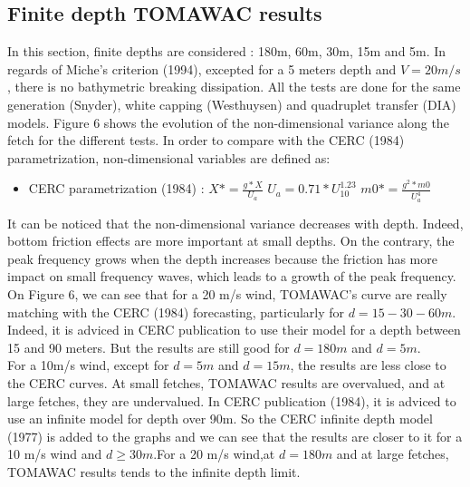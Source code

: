 \documentclass[10pt]{article}
\begin{document}
\subsection{Finite depth TOMAWAC results}
In this section, finite depths are considered : 180m, 60m, 30m, 15m and 5m. In regards of Miche's criterion (1994), excepted for a 5 meters depth and $V = 20m/s$, there is no bathymetric breaking dissipation. All the tests are done for the same generation (Snyder), white capping (Westhuysen) and quadruplet transfer (DIA) models. Figure 6 shows the evolution of the non-dimensional variance along the fetch for the different tests. In order to compare with the CERC (1984) parametrization, non-dimensional variables are defined as:\\
\begin{itemize}
\item CERC parametrization (1984) :
\subitem $X* = \frac{g*X}{U_a}$
\subitem $U_a = 0.71*U_{10}^{1.23}$
\subitem $m0* = \frac{g^2*m0}{U_a^4}$
\end{itemize}
It can be noticed that the non-dimensional variance decreases with depth. Indeed, bottom friction effects are more important at small depths. On the contrary, the peak frequency grows when the depth increases because the friction has more impact on small frequency waves, which leads to a growth of the peak frequency.\\
On Figure 6, we can see that for a 20 m/s wind, TOMAWAC's curve are really matching with the CERC (1984) forecasting, particularly for $d = 15 - 30 - 60 m$. Indeed, it is adviced in CERC publication to use their model for a depth between 15 and 90 meters. But the results are still good for $d = 180 m$ and $d = 5 m$.\\
For a 10m/s wind, except for $d = 5 m $ and $d = 15 m$, the results are less close to the CERC curves. At small fetches, TOMAWAC results are overvalued, and at large fetches, they are undervalued. In CERC publication (1984), it is adviced to use an infinite model for depth over 90m. So the CERC infinite depth model (1977) is added to the graphs and we can see that the results are closer to it for a 10 m/s wind and $d \geq 30m$.For a 20 m/s wind,at $d = 180m$ and at large fetches, TOMAWAC results tends to the infinite depth limit. 
\end{document}
